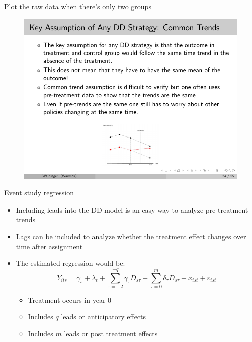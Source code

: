 \documentclass{beamer}
\begin{document}
\begin{frame}{Plot the raw data when there's only two groups}

	\begin{figure}
	\includegraphics[scale=2.5]{./lecture_includes/waldinger_dd_6.pdf}
	\end{figure}

\end{frame}



\begin{frame}{Event study regression}
	
	\begin{itemize}
	\item Including leads into the DD model is an easy way to analyze pre-treatment trends
	\item Lags can be included to analyze whether the treatment effect changes over time after assignment
	\item The estimated regression would be:$$Y_{its} = \gamma_s + \lambda_t + \sum_{\tau=-2}^{-q}\gamma_{\tau}D_{s\tau} + \sum_{\tau=0}^m\delta_{\tau}D_{s\tau}+x_{ist}+\varepsilon_{ist}$$
		\begin{itemize}
		\item Treatment occurs in year 0
		\item Includes $q$ leads or anticipatory effects
		\item Includes $m$ leads or post treatment effects
		\end{itemize}
	\end{itemize}
\end{frame}
\end{document}
